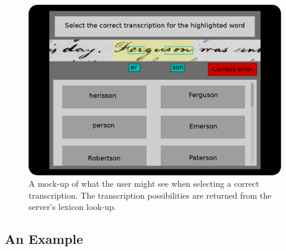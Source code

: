 \documentclass[ms]{byuprop}
\begin{document}
\begin{figure}
    \centering
    \includegraphics[width=.6\textwidth]{userTask_trans}
    \caption{A mock-up of what the user might see when selecting a correct transcription. The transcription possibilities are returned from the server's lexicon look-up.}
    \label{fig:userTask_trans}
\end{figure}


\subsection{An Example}
\end{document}
